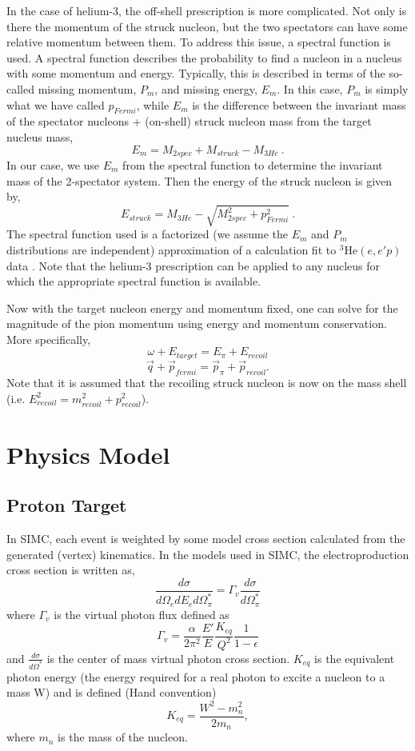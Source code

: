 In the case of helium-3, the off-shell prescription is more complicated.  
Not only is there the momentum of the struck nucleon, but 
the two spectators can have some relative momentum between them.  To address
this issue, a spectral function is used.  A spectral function
describes the probability to find a nucleon in a nucleus with some momentum
and energy.  Typically, this is described in terms of the so-called missing 
momentum, $P_m$, and missing energy, $E_m$.  In this case, $P_m$ is simply what
we have called $p_{Fermi}$, while $E_m$ is the difference between the invariant
mass of the spectator nucleons + (on-shell) struck nucleon mass from the 
target nucleus mass,
$$
E_m = M_{2spec} + M_{struck} - M_{3He} \:.
$$
In our case, we use $E_m$ from the spectral function to determine the invariant
mass of the 2-spectator system.  Then the energy of the struck nucleon is given
by,
$$
E_{struck} = M_{3He} - \sqrt{M_{2spec}^2+p_{Fermi}^2} \:.
$$
The spectral function used is a factorized (we assume the $E_m$ and $P_m$ 
distributions are independent) approximation of a calculation \cite{hajduk}
fit to $^3$He$(e,e'p)$ data \cite{jans}.  Note that the helium-3 prescription
can be applied to any nucleus for which the appropriate spectral function 
is available.

Now with the target nucleon energy and momentum fixed, one
can solve for the magnitude of the pion momentum using energy and momentum
conservation.  More specifically,
$$
\omega + E_{target} = E_{\pi} + E_{recoil}
$$
$$
\vec{q} + \vec{p}_{fermi} = \vec{p}_{\pi} + \vec{p}_{recoil}.
$$
Note that it is assumed that the recoiling struck nucleon is now on the mass 
shell (i.e. $E^2_{recoil}=m^2_{recoil}+p^2_{recoil}$).

\section{Physics Model}
\subsection{Proton Target}
In SIMC, each event is weighted by some model cross section calculated
from the generated (vertex) kinematics.  In the models used in SIMC, 
the electroproduction cross section is written as,
$$
\frac{d\sigma}{d\Omega_{e}dE_ed\Omega_{\pi}^{*}} = \Gamma_{v}
\frac{d\sigma}{d\Omega_{\pi}^{*}}
$$
where $\Gamma_v$ is the virtual photon flux defined as
$$
\Gamma_v = \frac{\alpha}{2\pi^2}\frac{E'}{E}\frac{K_{eq}}{Q^2}
\frac{1}{1-\epsilon}
$$
and $\frac{d\sigma}{d\Omega^{*}}$ is the center of mass virtual photon cross 
section.  $K_{eq}$ is the equivalent photon energy (the energy required for a
real photon to excite a nucleon to a mass W) and is defined (Hand 
convention)
$$
K_{eq} = \frac{W^2-m_{n}^2}{2m_{n}},
$$
where $m_n$ is the mass of the nucleon.

